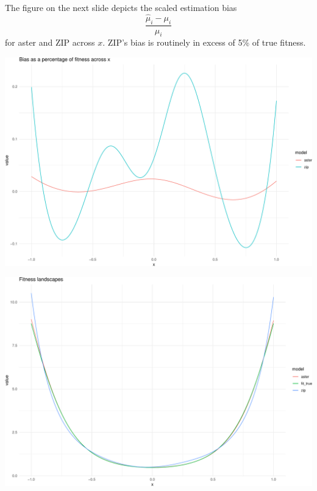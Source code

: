 \documentclass[
  ignorenonframetext,
]{beamer}
\begin{document}
\begin{frame}{}
\protect\hypertarget{section-60}{}
The figure on the next slide depicts the scaled estimation bias
\[\frac{\hat{\mu}_i - \mu_i}{\mu_i}\] for aster and ZIP across \(x\).
ZIP's bias is routinely in excess of 5\% of true fitness.
\end{frame}

\begin{frame}{}
\protect\hypertarget{section-61}{}
\includegraphics{week14p2_files/figure-beamer/unnamed-chunk-66-1.pdf}
\end{frame}

\begin{frame}{}
\protect\hypertarget{section-62}{}
\includegraphics{week14p2_files/figure-beamer/unnamed-chunk-67-1.pdf}
\end{frame}
\end{document}
